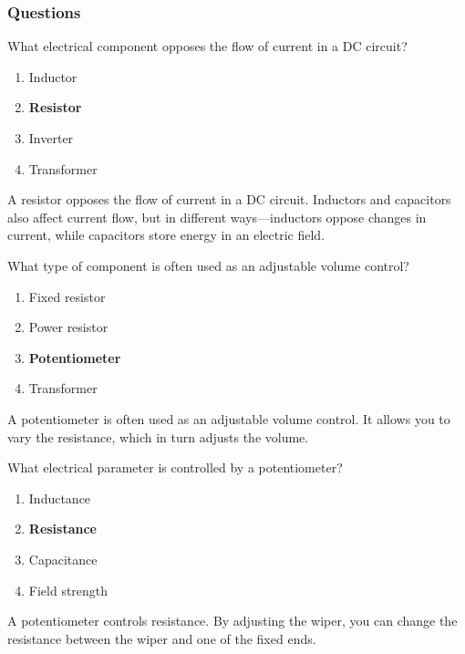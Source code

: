 \subsubsection{Questions}

\begin{tcolorbox}[colback=gray!10!white,colframe=black!75!black,title={T6A01}]
    What electrical component opposes the flow of current in a DC circuit?
    \begin{enumerate}[label=\Alph*),noitemsep]
        \item Inductor
        \item \textbf{Resistor}
        \item Inverter
        \item Transformer
    \end{enumerate}
\end{tcolorbox}
A resistor opposes the flow of current in a DC circuit. Inductors and capacitors also affect current flow, but in different ways—inductors oppose changes in current, while capacitors store energy in an electric field.

\begin{tcolorbox}[colback=gray!10!white,colframe=black!75!black,title={T6A02}]
    What type of component is often used as an adjustable volume control?
    \begin{enumerate}[label=\Alph*),noitemsep]
        \item Fixed resistor
        \item Power resistor
        \item \textbf{Potentiometer}
        \item Transformer
    \end{enumerate}
\end{tcolorbox}
A potentiometer is often used as an adjustable volume control. It allows you to vary the resistance, which in turn adjusts the volume.

\begin{tcolorbox}[colback=gray!10!white,colframe=black!75!black,title={T6A03}]
    What electrical parameter is controlled by a potentiometer?
    \begin{enumerate}[label=\Alph*),noitemsep]
        \item Inductance
        \item \textbf{Resistance}
        \item Capacitance
        \item Field strength
    \end{enumerate}
\end{tcolorbox}
A potentiometer controls resistance. By adjusting the wiper, you can change the resistance between the wiper and one of the fixed ends.

